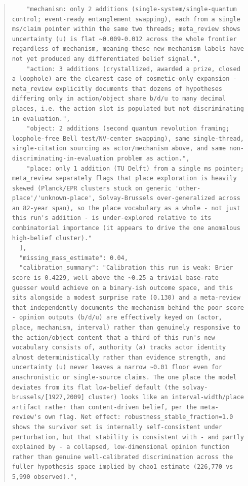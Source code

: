 \documentclass[11pt]{article}
\begin{document}
\begin{quote}
\begin{verbatim}
    "mechanism: only 2 additions (single-system/single-quantum control; event-ready entanglement swapping), each from a single ms/claim pointer within the same two threads; meta_review shows uncertainty (u) is flat ~0.009-0.012 across the whole frontier regardless of mechanism, meaning these new mechanism labels have not yet produced any differentiated belief signal.",
    "action: 3 additions (crystallized, awarded a prize, closed a loophole) are the clearest case of cosmetic-only expansion - meta_review explicitly documents that dozens of hypotheses differing only in action/object share b/d/u to many decimal places, i.e. the action slot is populated but not discriminating in evaluation.",
    "object: 2 additions (second quantum revolution framing; loophole-free Bell test/NV-center swapping), same single-thread, single-citation sourcing as actor/mechanism above, and same non-discriminating-in-evaluation problem as action.",
    "place: only 1 addition (TU Delft) from a single ms pointer; meta_review separately flags that place exploration is heavily skewed (Planck/EPR clusters stuck on generic 'other-place'/'unknown-place', Solvay-Brussels over-generalized across an 82-year span), so the place vocabulary as a whole - not just this run's addition - is under-explored relative to its combinatorial importance (it appears to drive the one anomalous high-belief cluster)."
  ],
  "missing_mass_estimate": 0.04,
  "calibration_summary": "Calibration this run is weak: Brier score is 0.4229, well above the ~0.25 a trivial base-rate guesser would achieve on a binary-ish outcome space, and this sits alongside a modest surprise rate (0.130) and a meta-review that independently documents the mechanism behind the poor score - opinion outputs (b/d/u) are effectively keyed on (actor, place, mechanism, interval) rather than genuinely responsive to the action/object content that a third of this run's new vocabulary consists of, authority (a) tracks actor identity almost deterministically rather than evidence strength, and uncertainty (u) never leaves a narrow ~0.01 floor even for anachronistic or single-source claims. The one place the model deviates from its flat low-belief default (the solvay-brussels/[1927,2009] cluster) looks like an interval-width/place artifact rather than content-driven belief, per the meta-review's own flag. Net effect: robustness_stable_fraction=1.0 shows the survivor set is internally self-consistent under perturbation, but that stability is consistent with - and partly explained by - a collapsed, low-dimensional opinion function rather than genuine well-calibrated discrimination across the fuller hypothesis space implied by chao1_estimate (226,770 vs 5,990 observed).",

\end{verbatim}
\end{quote}
\end{document}
